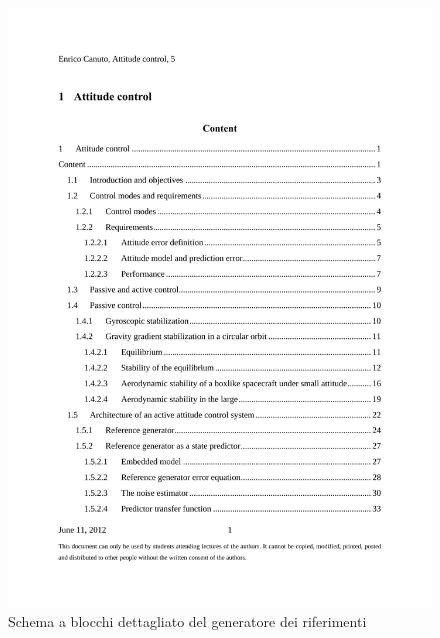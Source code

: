 \begin{figure}
	\includegraphics[width=\textwidth,page=37,clip=true,trim=2.8cm 15.7cm 2.7cm
3.5cm]{control/attitude_control/images/attitude_control.pdf}
\caption{Schema a blocchi dettagliato del generatore dei riferimenti}
\end{figure}

